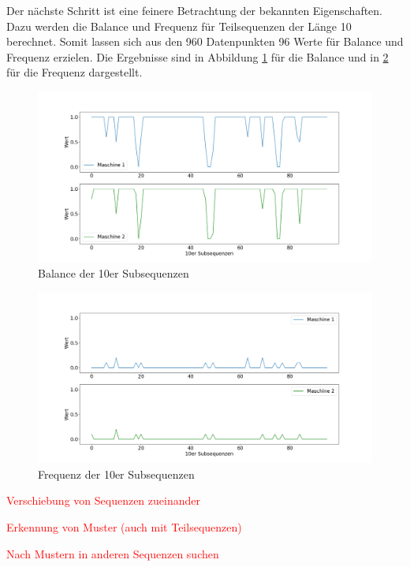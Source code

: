 Der nächste Schritt ist eine feinere Betrachtung der bekannten Eigenschaften. Dazu werden die Balance und Frequenz für Teilsequenzen der Länge 10 berechnet. Somit lassen sich aus den 960 Datenpunkten 96 Werte für Balance und Frequenz erzielen. Die Ergebnisse sind in Abbildung \ref{fig:procedure-balance-subsequence} für die Balance und in \ref{fig:procedure-frequency-subsequence} für die Frequenz dargestellt.

\begin{figure}[H]
	\centering
	\includegraphics[scale=0.32]{images/procedure/balance}
	\caption{Balance der 10er Subsequenzen}
	\label{fig:procedure-balance-subsequence}
\end{figure}

\begin{figure}[H]
	\centering
	\includegraphics[scale=0.32]{images/procedure/frequency}
	\caption{Frequenz der 10er Subsequenzen}
	\label{fig:procedure-frequency-subsequence}
\end{figure}

\textcolor{red}{
	\begin{list}{}{}
		\item Verschiebung von Sequenzen zueinander
		\item Erkennung von Muster (auch mit Teilsequenzen)
		\item Nach Mustern in anderen Sequenzen suchen
	\end{list}
}